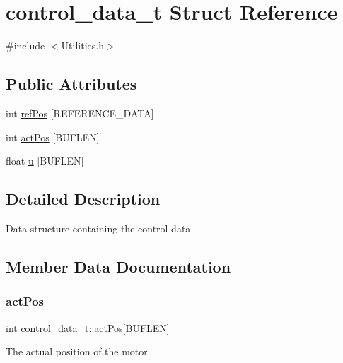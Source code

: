 \hypertarget{structcontrol__data__t}{}\section{control\+\_\+data\+\_\+t Struct Reference}
\label{structcontrol__data__t}


{\ttfamily \#include $<$Utilities.\+h$>$}

\subsection*{Public Attributes}
\begin{DoxyCompactItemize}
\item 
int \mbox{\hyperlink{structcontrol__data__t_a6ad7ecc535cbb0cd2070d49b0791f677}{ref\+Pos}} \mbox{[}R\+E\+F\+E\+R\+E\+N\+C\+E\+\_\+\+D\+A\+TA\mbox{]}
\item 
int \mbox{\hyperlink{structcontrol__data__t_a892c45389a98ba3bfc68972f71eaaf12}{act\+Pos}} \mbox{[}B\+U\+F\+L\+EN\mbox{]}
\item 
float \mbox{\hyperlink{structcontrol__data__t_afaa78dec7226a62a09817e6ac67f8b3a}{u}} \mbox{[}B\+U\+F\+L\+EN\mbox{]}
\end{DoxyCompactItemize}


\subsection{Detailed Description}
Data structure containing the control data 

\subsection{Member Data Documentation}
\mbox{\label{structcontrol__data__t_a892c45389a98ba3bfc68972f71eaaf12}} 
\subsubsection{\texorpdfstring{act\+Pos}{actPos}}
{\footnotesize\ttfamily int control\+\_\+data\+\_\+t\+::act\+Pos\mbox{[}B\+U\+F\+L\+EN\mbox{]}}

The actual position of the motor \mbox{\label{structcontrol__data__t_a6ad7ecc535cbb0cd2070d49b0791f677}} 
